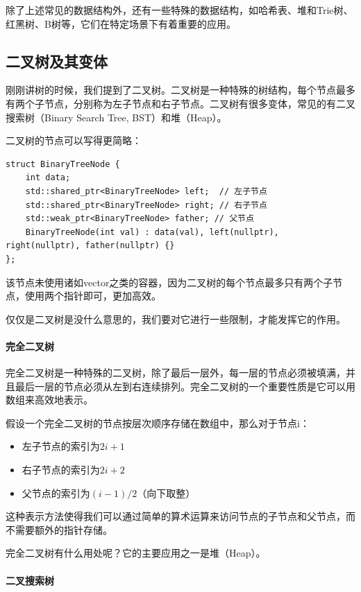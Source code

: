 除了上述常见的数据结构外，还有一些特殊的数据结构，如哈希表、堆和Trie树、红黑树、B树等，它们在特定场景下有着重要的应用。

\subsection{二叉树及其变体}

刚刚讲树的时候，我们提到了二叉树。二叉树是一种特殊的树结构，每个节点最多有两个子节点，分别称为左子节点和右子节点。二叉树有很多变体，常见的有二叉搜索树（Binary Search Tree, BST）和堆（Heap）。

二叉树的节点可以写得更简略：
\begin{verbatim}
struct BinaryTreeNode {
    int data;
    std::shared_ptr<BinaryTreeNode> left;  // 左子节点
    std::shared_ptr<BinaryTreeNode> right; // 右子节点
    std::weak_ptr<BinaryTreeNode> father; // 父节点
    BinaryTreeNode(int val) : data(val), left(nullptr), right(nullptr), father(nullptr) {}
};
\end{verbatim}
该节点未使用诸如vector之类的容器，因为二叉树的每个节点最多只有两个子节点，使用两个指针即可，更加高效。

仅仅是二叉树是没什么意思的，我们要对它进行一些限制，才能发挥它的作用。

\paragraph{完全二叉树}

完全二叉树是一种特殊的二叉树，除了最后一层外，每一层的节点必须被填满，并且最后一层的节点必须从左到右连续排列。完全二叉树的一个重要性质是它可以用数组来高效地表示。

假设一个完全二叉树的节点按层次顺序存储在数组中，那么对于节点i：
\begin{itemize}
    \item 左子节点的索引为$2i + 1$
    \item 右子节点的索引为$2i + 2$
    \item 父节点的索引为$(i - 1) / 2$（向下取整）
\end{itemize}
这种表示方法使得我们可以通过简单的算术运算来访问节点的子节点和父节点，而不需要额外的指针存储。

完全二叉树有什么用处呢？它的主要应用之一是堆（Heap）。

\paragraph{二叉搜索树}

